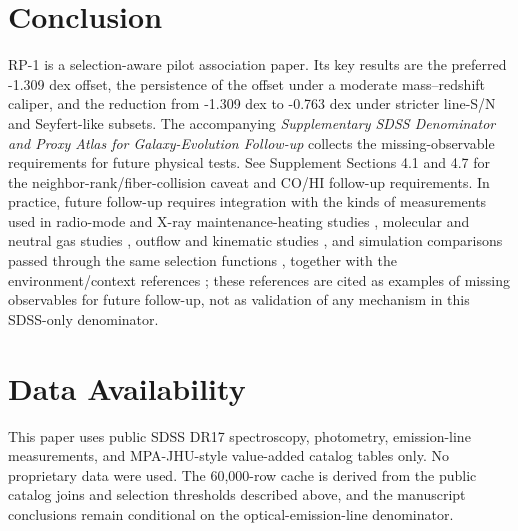 \documentclass[twocolumn]{aastex631}
\begin{document}
\section{Conclusion}
RP-1 is a selection-aware pilot association paper. Its key results are the preferred -1.309 dex offset, the persistence of the offset under a moderate mass--redshift caliper, and the reduction from -1.309 dex to -0.763 dex under stricter line-S/N and Seyfert-like subsets. The accompanying \emph{Supplementary SDSS Denominator and Proxy Atlas for Galaxy-Evolution Follow-up} collects the missing-observable requirements for future physical tests. See Supplement Sections 4.1 and 4.7 for the neighbor-rank/fiber-collision caveat and CO/HI follow-up requirements.
In practice, future follow-up requires integration with the kinds of measurements used in radio-mode and X-ray maintenance-heating studies \citep{best2005,fabian2012,mcnamara2007,heckmanbest2014,lamassa2013}, molecular and neutral gas studies \citep{xcoldgass2017,xgass2018}, outflow and kinematic studies \citep{veilleux2005,cicone2014,carniani2017,fiore2017}, and simulation comparisons passed through the same selection functions \citep{simba2019,tng2019,eagle2015}, together with the environment/context references \citep{peng2010,ellison2011,piotrowska2022,wetzel2013,dekel2006}; these references are cited as examples of missing observables for future follow-up, not as validation of any mechanism in this SDSS-only denominator.

\section*{Data Availability}
This paper uses public SDSS DR17 spectroscopy, photometry, emission-line measurements, and MPA-JHU-style value-added catalog tables only. No proprietary data were used. The 60,000-row cache is derived from the public catalog joins and selection thresholds described above, and the manuscript conclusions remain conditional on the optical-emission-line denominator.

\end{document}
